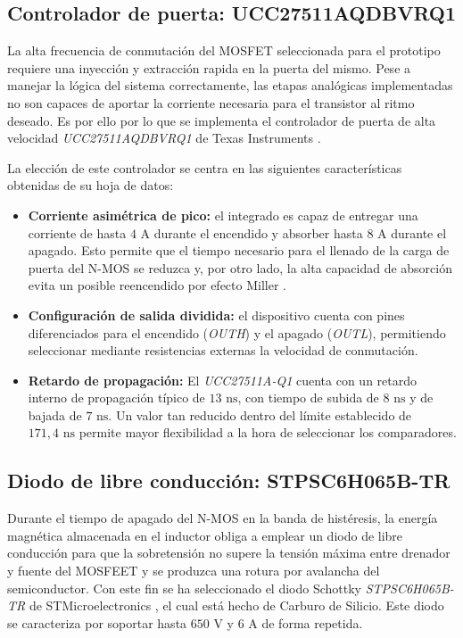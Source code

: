 \documentclass[12pt]{report} %
\begin{document}
\subsection{Controlador de puerta: UCC27511AQDBVRQ1}
La alta frecuencia de conmutación del MOSFET seleccionada para el prototipo requiere una inyección y extracción rapida en la puerta del mismo. Pese a manejar la lógica del sistema correctamente, las etapas analógicas implementadas no son capaces de aportar la corriente necesaria para el transistor al ritmo deseado. Es por ello por lo que se implementa el controlador de puerta de alta velocidad \textit{UCC27511AQDBVRQ1} de Texas Instruments \cite{texas_instruments_ucc27511a_nodate}.

La elección de este controlador se centra en las siguientes características obtenidas de su hoja de datos:

\begin{itemize}
    \item \textbf{Corriente asimétrica de pico:} el integrado es capaz de entregar una corriente de hasta $4\text{ A}$ durante el encendido y absorber hasta $8\text{ A}$ durante el apagado. Esto permite que el tiempo necesario para el llenado de la carga de puerta del N-MOS se reduzca y, por otro lado, la alta capacidad de absorción evita un posible reencendido por efecto Miller \cite{noauthor_efecto_nodate}.
    \item \textbf{Configuración de salida dividida:} el dispositivo cuenta con pines diferenciados para el encendido (\textit{OUTH}) y el apagado (\textit{OUTL}), permitiendo seleccionar mediante resistencias externas la velocidad de conmutación. 
    \item \textbf{Retardo de propagación:} El \textit{UCC27511A-Q1} cuenta con un retardo interno de propagación típico de $13\text{ ns}$, con tiempo de subida de $8\text{ ns}$ y de bajada de $7\text{ ns}$. Un valor tan reducido dentro del límite establecido de $171{,}4\text{ ns}$ permite mayor flexibilidad a la hora de seleccionar los comparadores. 
\end{itemize}

\subsection{Diodo de libre conducción: STPSC6H065B-TR}
Durante el tiempo de apagado del N-MOS en la banda de histéresis, la energía magnética almacenada en el inductor obliga a emplear un diodo de libre conducción para que la sobretensión no supere la tensión máxima entre drenador y fuente del MOSFEET y se produzca una rotura por avalancha del semiconductor. 
Con este fin se ha seleccionado el diodo Schottky \textit{STPSC6H065B-TR} de STMicroelectronics \cite{stmicroelectronics_stpsc6h065_nodate}, el cual está hecho de Carburo de Silicio. Este diodo se caracteriza por soportar hasta $650\text{ V}$ y $6\text{ A}$ de forma repetida. 
\end{document}
